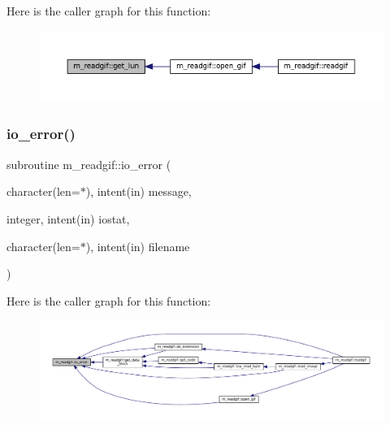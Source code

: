Here is the caller graph for this function\+:
\nopagebreak
\begin{figure}[H]
\begin{center}
\leavevmode
\includegraphics[width=350pt]{namespacem__readgif_a7109d632cddcb8d66729d25bbed5c33c_icgraph}
\end{center}
\end{figure}
\mbox{\label{namespacem__readgif_ae01d3edbe9e15bf4dd33070581e26fee}} 
\subsubsection{\texorpdfstring{io\+\_\+error()}{io\_error()}}
{\footnotesize\ttfamily subroutine m\+\_\+readgif\+::io\+\_\+error (\begin{DoxyParamCaption}\item[{character(len=$\ast$), intent(in)}]{message,  }\item[{integer, intent(in)}]{iostat,  }\item[{character(len=$\ast$), intent(in)}]{filename }\end{DoxyParamCaption})\hspace{0.3cm}{\ttfamily [private]}}

Here is the caller graph for this function\+:
\nopagebreak
\begin{figure}[H]
\begin{center}
\leavevmode
\includegraphics[width=350pt]{namespacem__readgif_ae01d3edbe9e15bf4dd33070581e26fee_icgraph}
\end{center}
\end{figure}
\mbox{\label{namespacem__readgif_a314e657d0662360266bac5702a657ef1}} 
